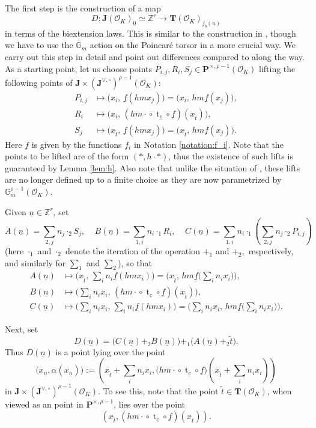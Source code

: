 \documentclass[11pt,oneside]{amsart}
\theoremstyle{plain}
\theoremstyle{definition}
\def\lra{{\longrightarrow}}
\def\G{{\bf G}}
\DeclareMathOperator{\tr}{t}
\def\TT{\mathbf{T}}
\def\Z{\mathbb{Z}}
\def\J{\mathbf{J}}
\def\Jo{\mathbf{J}^{\vee,\circ}}
\def\G{\mathbb{G}}
\def\P{\mathbf{P}}
\def\oh{\mathcal{O}}
\begin{document}
The first step is the construction of a map 
\[ 
D : \J(\oh_K)_0 \simeq \Z^r \lra \TT(\oh_K)_{j_b(u)}
\]
in terms of the biextension laws. This is similar to the construction in \cite[\S 4]{EL19}, though we have to use the $\G_m$ action on the Poincar\'e torsor in a more crucial way. We carry out this step in detail and point out differences compared to \cite{EL19} along the way. As a starting point, let us choose points $P_{i, j}, R_{i}, S_{j} \in \P^{\times, \rho-1}(\oh_K)$ lifting the following points of $\J \times (\Jo)^{\rho-1}(\oh_K):$ 
\begin{align*}
P_{i, j} &\longmapsto \Big(x_i,\, \underline{f}(hmx_j)\Big)=\Big(x_i,\, hm\underline{f}(x_j)\Big),\\
R_{i} &\longmapsto \Big(x_i,\, ({hm\cdot}\circ \tr_{\underline{c}}\circ \underline{f})(x_{\tilde{t}})\Big),\\
S_{j} &\longmapsto \Big(x_{\tilde{t}},\, \underline{f}(hmx_j)\Big)=\Big(x_{\tilde{t}},\, hm\underline{f}(x_j)\Big).
\end{align*}
Here $\underline{f}$ is given by the functions $f_i$ in Notation \ref{notation:f_i}. 
Note that the points to be lifted are of the form $(*, h\cdot *)$, thus the existence of such lifts is guaranteed by Lemma \ref{lem:h}. Also note that unlike the situation of \cite{EL19}, these lifts are no longer defined up to a finite choice as they are now parametrized by $\G_m^{\rho-1}(\oh_K)$. 

Given $\underline{n} \in \Z^{r}$, set
$$A(\underline{n})={\sum}_{2, j}n_j \cdot_2 S_j,\;\;\;\; B(\underline{n})={\sum}_{1, i}n_i \cdot_1 R_i,\;\;\;\; C(\underline{n})={\sum}_{1, i}n_i \cdot_1 \left( {\sum}_{2, j}n_j \cdot_2 P_{i, j} \right)$$
(here $\cdot_1$ and $\cdot_2$ denote the iteration of the operation $+_1$ and $+_2,$ respectively, and similarly for $\sum_1$ and $\sum_2$), so that
\begin{align*}
A(\underline{n}) &\longmapsto \Big(x_{\tilde{t}},\, \sum_{i}n_i\underline{f}(hmx_i)\Big)=\Big(x_{\tilde{t}},\, hm\underline{f}\big(\sum_{i}n_ix_i\big)\Big),\\
B(\underline{n}) &\longmapsto \Big(\sum_i n_i x_i,\, ({hm\cdot}\circ \tr_{\underline{c}}\circ \underline{f})(x_{\tilde{t}})\Big),\\
C(\underline{n}) &\longmapsto \Big(\sum_i n_i x_i,\, \sum_{i}n_i\underline{f}(hmx_i)\Big)=\Big(\sum_i n_i x_i,\, hm\underline{f}\big(\sum_{i}n_ix_i\big)\Big).
\end{align*}
 
Next, set 
$$D(\underline{n})=\big(C(\underline{n})+_2B(\underline{n})\big)+_1\big(A(\underline{n})+_2\tilde{t}\big).$$
Thus $D(\underline{n})$ is a point lying over the point
$$\big(x_{\underline{n}}, \alpha(x_{\underline{n}})\big):=\left(x_{\tilde{t}} + \sum_{i}n_ix_i, \big({hm\cdot} \circ \tr_{\underline{c}}\circ \underline{f}\big)\left(x_{\tilde{t}}+ \sum_in_i x_i\right) \right)$$
in $\J\times (\Jo)^{\rho-1}(\oh_K)$. To see this, note that the point $\tilde{t} \in \TT (\oh_K)$, when viewed as an point in $\P^{\times, \rho-1}$, lies over the point 
$$(x_{\tilde{t}}, ({hm\cdot}\circ \tr_{\underline{c}}\circ \underline{f})(x_{\tilde{t}}) ).$$
\end{document}
